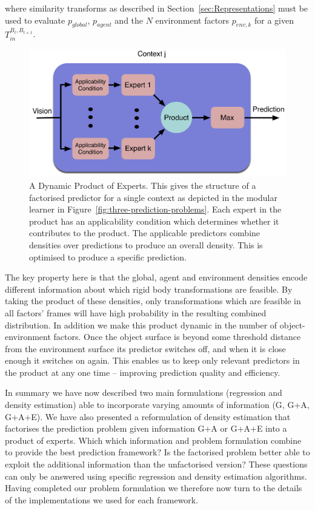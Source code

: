 \noindent where similarity transforms as described in Section~\ref{sec:Representations} must be used to evaluate $p_{global}$, $p_{agent}$ and the $N$ environment factors $p_{env,k}$ for a given ${T}_{in}^{B_{t}, B_{t+1}}$.
\begin{figure}[t]
\centerline{\includegraphics[width=0.9\columnwidth]{product-predictor}}
\caption[Factored Prediction]{ A Dynamic Product of Experts. This gives the structure of a factorised predictor for a single context as depicted in the modular learner in Figure~\ref{fig:three-prediction-problems}. Each expert in the product has an applicability condition which determines whether it contributes to the product. The applicable predictors combine densities over predictions to produce an overall density. This is optimised to produce a specific prediction.}
\label{fig:modular}
\end{figure}

The key property here is that the global, agent and environment densities encode different information about which rigid body transformations are feasible. By taking the product of these densities, only transformations which are feasible in all factors' frames will have high probability in the resulting combined distribution. In addition we make this product dynamic in the number of object-environment factors. Once the object surface is beyond some threshold distance from the environment surface its predictor switches off, and when it is close enough it switches on again. This enables us to keep only relevant predictors in the product at any one time -- improving prediction quality and efficiency. 

In summary we have now described two main formulations (regression and density estimation) able to incorporate varying amounts of information (G, G+A, G+A+E). We have also presented a reformulation of density estimation that factorises the prediction problem given information G+A or G+A+E into a product of experts. Which which information and problem formulation combine to provide the best prediction framework?
Is the factorised problem better able to exploit the additional
information than the unfactorised version? These questions can only be
answered using specific regression and density estimation
algorithms. Having completed our problem formulation we therefore now
turn to the details of the implementations we used for each framework.
